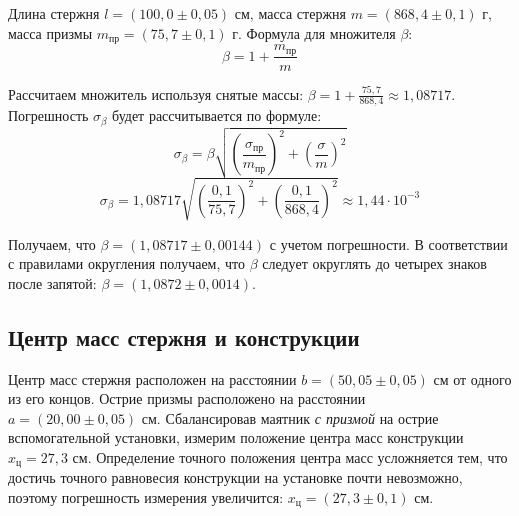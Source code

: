 	Длина стержня $l = \left(  100,0 \pm 0,05\right)$ см, масса стержня $m =\left(  868,4 \pm 0,1\right)$ г, масса призмы $m_\text{пр}=\left( 75,7 \pm 0,1\right)$ г. Формула для множителя $\beta$:
	\begin{equation}
		\beta=1+\frac{m_\text{пр}}{m}
	\end{equation}
	
	\noindent Рассчитаем множитель используя снятые массы: $\beta = 1+\frac{75,7}{868,4}\approx1,08717$. Погрешность  $\sigma_\text{$\beta$}$ будет рассчитывается по формуле:
	\begin{equation}
		\sigma_\text{$\beta$}=\beta\sqrt{\left(\frac{\sigma_\text{пр}}{m_\text{пр}}\right)^2+\left(\frac{\sigma}{m}\right)^2}
	\end{equation}
	\begin{equation}
		\sigma_\text{$\beta$}=1,08717\sqrt{\left(\frac{0,1}{75,7}\right)^2+\left(\frac{0,1}{868,4}\right)^2}\approx 1,44\cdot 10^{-3}
	\end{equation}
	\par Получаем, что $\beta = \left( 1,08717 \pm 0,00144\right)$ с учетом погрешности. В соответствии с правилами округления получаем, что $\beta$ следует округлять до четырех знаков после запятой: $\beta = \left( 1,0872 \pm 0,0014\right)$.
	
	\subsection{Центр масс стержня и конструкции}
	Центр масс стержня расположен на расстоянии $b = (50, 05 \pm 0,05) \text{ см}$ от одного из его концов. Острие призмы расположено на расстоянии $a = (20,00 \pm 0,05) \text{ см}$. 
	Сбалансировав маятник \emph{с призмой} на острие вспомогательной установки, измерим положение центра масс конструкции $x_\text{ц} = 27,3\text{ см}$. Определение точного положения центра масс усложняется тем, что достичь точного равновесия конструкции на установке почти невозможно, поэтому погрешность измерения увеличится: $x_\text{ц} = (27,3 \pm 0,1)\text{ см}$.
	

